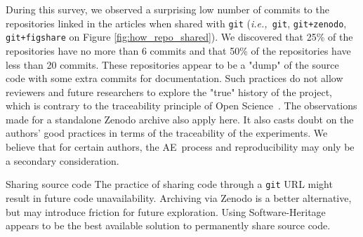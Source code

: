 \documentclass[sigconf,natbib=false]{acmart}
\newcommand{\ie}{\emph{i.e.,}}
\newcommand{\aeval}{AE}
\newcommand{\todo}[1]{{\color{red}{TODO: #1}}}
\begin{document}


During this survey, we observed a surprising low number of commits to the repositories linked in the articles when shared with \texttt{git} (\ie\ \texttt{git}, \texttt{git+zenodo}, \texttt{git+figshare} on Figure \ref{fig:how_repo_shared}).
We discovered that 25\% of the repositories have no more than 6 commits and that 50\% of the repositories have less than 20 commits.
These repositories appear to be a "dump" of the source code with some extra commits for documentation.
Such practices do not allow reviewers and future researchers to explore the "true" history of the project, which is contrary to the traceability principle of Open Science\ \cite{openscience_unesco}.
The observations made for a standalone Zenodo archive also apply here.
It also casts doubt on the authors' good practices in terms of the traceability of the experiments.
We believe that for certain authors, the \aeval\ process and reproducibility may only be a secondary consideration. 

\begin{lesson}{Sharing source code}{}
  The practice of sharing code through a \texttt{git} URL might result in future code unavailability.
  Archiving via Zenodo is a better alternative, but may introduce friction for future exploration.
  Using Software-Heritage appears to be the best available solution to permanently share source code.
\end{lesson}
\end{document}
